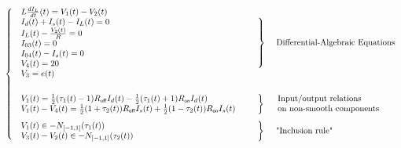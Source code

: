 \begin{equation}
  \label{eq:72}
 \left\{ \begin{array}{l l l}
    \begin{array}{l}
      L  \frac{dI_L}{dt}(t) = V_1(t)-V_2(t) \\
      I_d(t)+I_s(t)-I_L(t)=0 \\
      I_L(t)-\frac{V_2(t)}{R}=0\\
      I_{03}(t)=0\\
      I_{04}(t)-I_{s}(t)=0\\
      V_4(t)=20\\
      V_3=e(t)\\
\end{array}
& \left.\begin{array}{l}
      \\
      \\ \\ \\ \\
\end{array}\right\}& \text{ Differential-Algebraic Equations}\\ \\[2mm]
  \begin{array}{l}
V_{1}(t)=\frac{1}{2}(\tau_{1}(t)-1)R_\off I_{d}(t)-\frac{1}{2}(\tau_{1}(t)+1) R_\on I_{d}(t) \\ 
V_{1}(t)-V_{4}(t)=\frac{1}{2}(1+\tau_{2}(t)) R_\off I_{s}(t)+\frac{1}{2}(1-\tau_{2}(t)) R_\on I_{s}(t)
  \end{array} & \left.\begin{array}{c}
     \\ \\
  \end{array}\right\} & \begin{array}{l}
   \text{Input/output relations }\\
   \text{on non-smooth components}
  \end{array}  \\  [5mm]
  \begin{array}{l}
  V_{1}(t) \in - N_{[-1,1]}(\tau_{1}(t)) \\   V_{3}(t)-V_{2}(t) \in -N_{[-1,1]}(\tau_{2}(t))
\end{array} 
& \left.\begin{array}{c} \\ \\ \end{array}\right\}  &  \text{ "Inclusion rule"}\\ 
\end{array}\right.
\end{equation}

